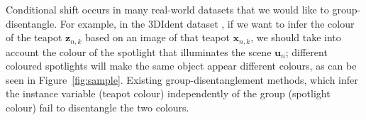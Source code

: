 \documentclass{article} %
\newcommand{\change}[1]{#1}
\newcommand{\todo}[1]{\textcolor{red}{#1}}
\begin{document}

\change{Conditional shift occurs in many real-world datasets that we would like to group-disentangle. For example, in the 3DIdent dataset \citep{Zimmerman2021Contrastive}, if we want to infer the colour of the teapot $\mathbf{z}_{n,k}$ based on an image of that teapot $\mathbf{x}_{n,k}$, we should take into account the colour of the spotlight that illuminates the scene $\mathbf{u}_{n}$; different coloured spotlights will make the same object appear different colours, as can be seen in Figure~\ref{fig:sample}. Existing group-disentanglement methods, which infer the instance variable (teapot colour) independently of the group (spotlight colour) fail to disentangle the two colours.}
\end{document}
